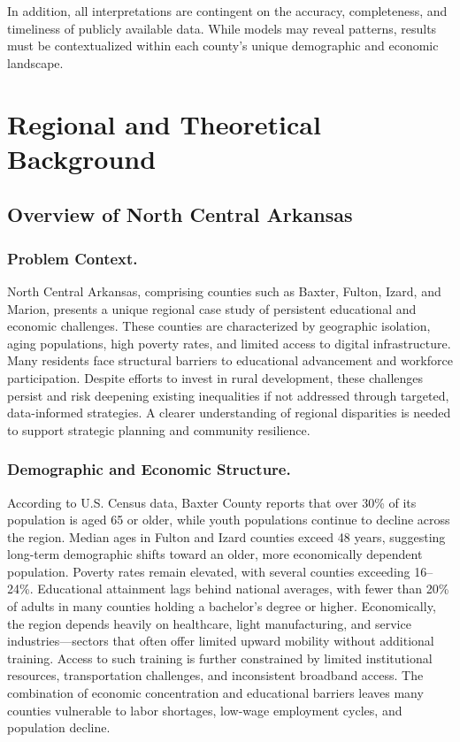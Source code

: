\documentclass[12pt]{llncs}
\begin{document}
In addition, all interpretations are contingent on the accuracy, completeness, and timeliness of publicly available data. While models may reveal patterns, results must be contextualized within each county’s unique demographic and economic landscape.

\section{Regional and Theoretical Background}

\subsection{Overview of North Central Arkansas}
\subsubsection{\textbf{Problem Context.}}
North Central Arkansas, comprising counties such as Baxter, Fulton, Izard, and Marion, presents a unique regional case study of persistent educational and economic challenges. These counties are characterized by geographic isolation, aging populations, high poverty rates, and limited access to digital infrastructure. Many residents face structural barriers to educational advancement and workforce participation. Despite efforts to invest in rural development, these challenges persist and risk deepening existing inequalities if not addressed through targeted, data-informed strategies\cite{usda_broadband_2020}. A clearer understanding of regional disparities is needed to support strategic planning and community resilience.

\subsubsection{\textbf{Demographic and Economic Structure.} }
According to U.S. Census data, Baxter County reports that over 30\% of its population is aged 65 or older, while youth populations continue to decline across the region. Median ages in Fulton and Izard counties exceed 48 years, suggesting long-term demographic shifts toward an older, more economically dependent population. Poverty rates remain elevated, with several counties exceeding 16–24\%. Educational attainment lags behind national averages, with fewer than 20\% of adults in many counties holding a bachelor's degree or higher. Economically, the region depends heavily on healthcare, light manufacturing, and service industries—sectors that often offer limited upward mobility without additional training. Access to such training is further constrained by limited institutional resources, transportation challenges, and inconsistent broadband access. The combination of economic concentration and educational barriers leaves many counties vulnerable to labor shortages, low-wage employment cycles, and population decline.
\end{document}
